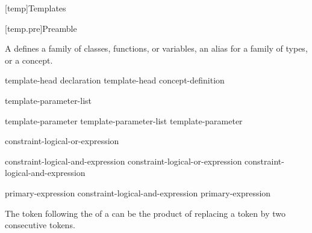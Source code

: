 [temp]{Templates}%


%

[temp.pre]{Preamble}

\pnum
A  defines a family of classes, functions, or variables,
an alias for a family of types, or a concept.

\begin{bnf}
\br
  template-head declaration\br
  template-head concept-definition
\end{bnf}

\begin{bnf}
\br
   \terminal{<} template-parameter-list \terminal{>} 
\end{bnf}

\begin{bnf}
\br
  template-parameter\br
  template-parameter-list \terminal{,} template-parameter
\end{bnf}

\begin{bnf}
\br
   constraint-logical-or-expression
\end{bnf}

\begin{bnf}
\br
  constraint-logical-and-expression\br
  constraint-logical-or-expression \terminal{||} constraint-logical-and-expression
\end{bnf}

\begin{bnf}
\br
  primary-expression\br
  constraint-logical-and-expression \terminal{\&\&} primary-expression
\end{bnf}

\begin{note}
The \tcode{>} token following the
 of a
can be the product of replacing a
\tcode{>>} token by two consecutive \tcode{>}
tokens.
\end{note}

